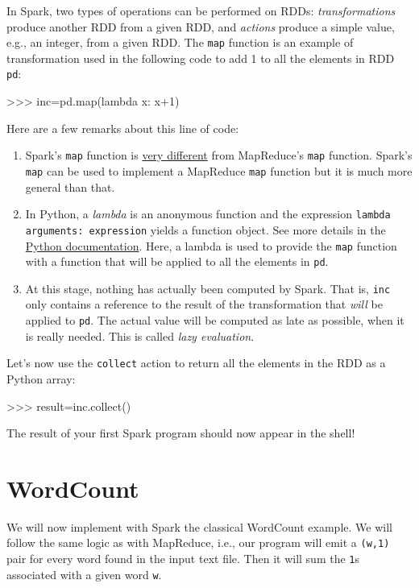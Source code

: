 \documentclass[11pt]{article}
\begin{document}
In Spark, two types of operations can be performed on RDDs:
\emph{transformations} produce another RDD from a given RDD, and
\emph{actions} produce a simple value, e.g., an integer, from a given
RDD. The \texttt{map} function is an example of transformation used in
the following code to add 1 to all the elements in RDD \texttt{pd}:
\begin{cli}
  >>> inc=pd.map(lambda x: x+1)
\end{cli}
Here are a few remarks about this line of code:
\begin{enumerate}
\item Spark's \texttt{map} function is \underline{very different} from
  MapReduce's \texttt{map} function. Spark's
  \texttt{map} can be used to implement a MapReduce \texttt{map}
  function but it is much more general than that.
\item In Python, a \emph{lambda} is an anonymous function and the expression \texttt{lambda arguments:
    expression} yields a function object. See more details in the
  \href{https://docs.python.org/2/reference/expressions.html#lambda}{Python
    documentation}.  Here, a lambda is used to provide 
  the \texttt{map} function with a function that will be applied to all the elements
  in \texttt{pd}.
  \item At this stage, nothing has actually been computed by
    Spark. That is, \texttt{inc} only contains a reference to the
    result of the transformation that \emph{will} be applied to \texttt{pd}. The
    actual value will be computed as late as possible, when it is
    really needed. This is called \emph{lazy evaluation}. 
\end{enumerate}
Let's now use the \texttt{collect} action to return all the elements
in the RDD as a Python array:
\begin{cli}
  >>> result=inc.collect()
\end{cli}
The result of your first Spark program should now appear in the shell!

\section{WordCount}

We will now implement with Spark the classical WordCount example. We
will follow the same logic as with MapReduce, i.e., our program will
emit a \texttt{(w,1)} pair for every word found in the input text
file. Then it will sum the \texttt{1}s associated with a given word
\texttt{w}.
\end{document}
